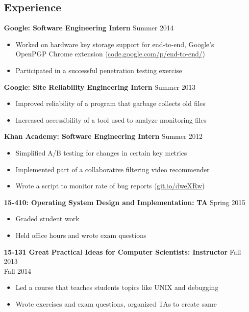 \documentclass[margin]{res}
\begin{document}
\begin{resume}
\section{Experience}
  \textbf{Google: Software Engineering Intern} \hfill Summer 2014
  \begin{itemize} \itemsep -2pt  %
    \item Worked on hardware key storage support for end-to-end, Google's\\
      OpenPGP Chrome extension
      (\href{https://code.google.com/p/end-to-end/}{code.google.com/p/end-to-end/})
    \item Participated in a successful penetration testing exercise
  \end{itemize}
  \textbf{Google: Site Reliability Engineering Intern}
    \hfill Summer 2013
  \begin{itemize} \itemsep -2pt  %
    \item Improved reliability of a program that garbage collects old files
    \item Increased accessibility of a tool used to analyze monitoring files
  \end{itemize}

  \textbf{Khan Academy: Software Engineering Intern} \hfill Summer 2012
  \begin{itemize} \itemsep -2pt %
  \item Simplified A/B testing for changes in certain key metrics
  \item Implemented part of a collaborative filtering video recommender
  \item Wrote a script to monitor rate of bug reports
    (\href{https://github.com/Khan/beep-boop}{git.io/dweXRw})
  \end{itemize}

  \textbf{15-410: Operating System Design and Implementation: TA} \hfill Spring 2015
  \begin{itemize} \itemsep -2pt
      \item Graded student work
      \item Held office hours and wrote exam questions
    \end{itemize}

  \textbf{15-131 Great Practical Ideas for Computer Scientists: Instructor}
    \hfill Fall 2013 \\ \hphantom{1em} \hfill Fall 2014

  \vspace{-1em}\vspace{-1ex}
  \begin{itemize} \itemsep -2pt
    \item Led a course that teaches students topics like UNIX and debugging
    \item Wrote exercises and exam questions, organized TAs to create same
  \end{itemize}


\end{resume}
\end{document}
